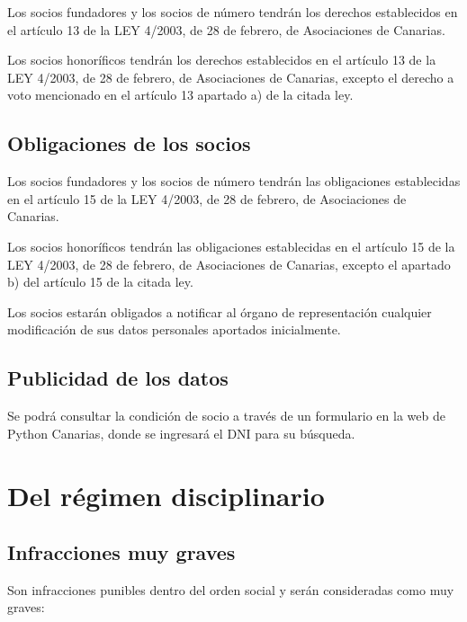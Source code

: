 \documentclass[a4paper, 12pt, oneside]{book}
\begin{document}
Los socios fundadores y los socios de número tendrán los derechos establecidos en el artículo 13 de la LEY 4/2003, de 28 de febrero, de Asociaciones de Canarias.

Los socios honoríficos tendrán los derechos establecidos en el artículo 13 de la LEY 4/2003, de 28 de febrero, de Asociaciones de Canarias, excepto el derecho a voto mencionado en el artículo 13 apartado a) de la citada ley.

\section{Obligaciones de los socios}

Los socios fundadores y los socios de número tendrán las obligaciones establecidas en el artículo 15 de la LEY 4/2003, de 28 de febrero, de Asociaciones de Canarias.

Los socios honoríficos tendrán las obligaciones establecidas en el artículo 15 de la LEY 4/2003, de 28 de febrero, de Asociaciones de Canarias, excepto el apartado b) del artículo 15 de la citada ley.

Los socios estarán obligados a notificar al órgano de representación cualquier modificación de sus datos personales aportados inicialmente.

\section{Publicidad de los datos}

Se podrá consultar la condición de socio a través de un formulario en la web de Python Canarias, donde se ingresará el DNI para su búsqueda.

\chapter{Del régimen disciplinario}

\section{Infracciones muy graves}

Son infracciones punibles dentro del orden social y serán consideradas como muy graves:
\end{document}
